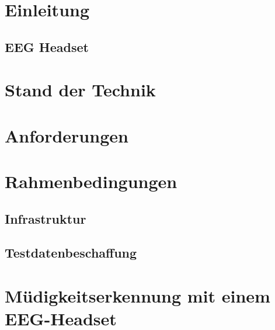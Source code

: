 \pagestyle{WissDokuNorm}

\cleardoublepage


\cleardoublepage
\chapter{Einleitung}


\section{EEG Headset}


\chapter{Stand der Technik}


\chapter{Anforderungen}


\chapter{Rahmenbedingungen}


\section{Infrastruktur}


\section{Testdatenbeschaffung}



\chapter{Müdigkeitserkennung mit einem EEG-Headset}


